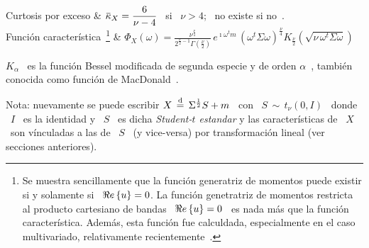 \begin{center}
\begin{tabular}
\hline
Curtosis por exceso & $\displaystyle \widebar{\kappa}_X = \frac{6}{\nu-4}$ \ si
\ $\nu > 4$; \ no existe si no~.\\[2mm]
\hline
%
Funci\'on caracter\'istica~\footnote{Se muestra sencillamente que la funci\'on
generatriz de momentos puede existir si y solamente si \ $\Re e \left\{ u \right\} = 0$. La
funci\'on genetratriz de momentos restricta al producto cartesiano de bandas \
$\Re e \left\{ u \right\} = 0$ \ es nada m\'as que la funci\'on caracter\'istica. Adem\'as, esta
funci\'on fue calculdada, especialmente en el caso multivariado, relativamente
recientemente~\cite{Sut86, Hur95, KibJoa06, SonPar14}.} & $\displaystyle
\Phi_X(\omega) = \frac{\nu^{\frac{\nu}{4}}}{2^{\frac{\nu}{2}-1} \Gamma\left(
\frac{\nu}{2} \right)} \, e^{\imath \omega^t m} \, \left( \omega^t \Sigma \omega
\right)^{\frac{\nu}{4}} K_{\frac{\nu}{2}}\left( \sqrt{\nu \, \omega^t \Sigma
\omega} \right) $\\[2mm]
\hline
\end{tabular}
\end{center}
%
$K_\alpha$ \  es la funci\'on  Bessel modificada de  segunda especie y  de orden
$\alpha$~\cite{AbrSte70,  GraRyz15, Wat22,  GraMat95},  tambi\'en conocida  como
funci\'on de MacDonald~\cite{Mac98}.

Nota: nuevamente se puede escribir $X \, \stackrel{\mathrm{d}}{=} \, \Sigma^{\frac12} S + m$ \ con
\ $S \, \sim \,  t_\nu(0,I)$ \ donde \ $I$ \ es la identidad  y \ $S$ \ es dicha
{\em Student-$t$ estandar}  y las caracter\'isticas de \ $X$  \ son v\'inculadas a
las  de  \ $S$  \  (y vice-versa)  por  transformaci\'on  lineal (ver  secciones
anteriores).


